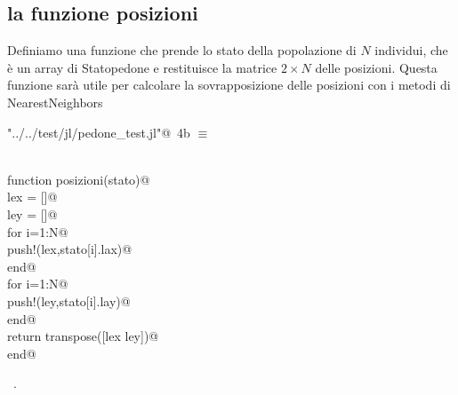 \documentclass[]{article}
\begin{document}
\subsection{la funzione posizioni}
Definiamo una funzione che prende lo stato della popolazione di $N$ individui, che è un array di Statopedone e restituisce la matrice $2\times N$ delle posizioni.
Questa funzione sarà utile per calcolare la sovrapposizione delle posizioni con i metodi di NearestNeighbors
\begin{flushleft} \small
\begin{minipage}{\linewidth} \label{scrap7}
\protect{}\verb@"../../test/jl/pedone_test.jl"@\nobreak\ {\footnotesize 4b }$\equiv$
\vspace{-1ex}
\begin{list}{}{} \item
\mbox{}\verb@@\\
\mbox{}\verb@ function posizioni(stato)@\\
\mbox{}\verb@       lex = []@\\
\mbox{}\verb@       ley = []@\\
\mbox{}\verb@       for i=1:N@\\
\mbox{}\verb@           push!(lex,stato[i].lax)@\\
\mbox{}\verb@       end@\\
\mbox{}\verb@       for i=1:N@\\
\mbox{}\verb@           push!(ley,stato[i].lay)@\\
\mbox{}\verb@       end@\\
\mbox{}\verb@       return transpose([lex ley])@\\
\mbox{}\verb@       end@\\
\mbox{}\verb@@{\NWsep}
\end{list}
\vspace{-1ex}
\footnotesize\addtolength{\baselineskip}{-1ex}
\begin{list}{}{\setlength{\itemsep}{-\parsep}\setlength{\itemindent}{-\leftmargin}}
\item \NWtxtFileDefBy\ .
\end{list}
\end{minipage}\\[4ex]
\end{flushleft}

%
\end{document}
